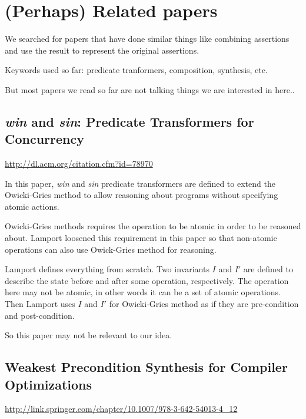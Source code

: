 \documentclass[12pt, fleqn]{article}
\begin{document}

\section{(Perhaps) Related papers}

We searched for papers that have done similar things like combining
assertions and use the result to represent the original assertions.

Keywords used so far: predicate tranformers, composition, synthesis,
etc.

But most papers we read so far are not talking things we are
interested in here..

\subsection{\textsl{win} and \textsl{sin}: Predicate Transformers for Concurrency}

\url{http://dl.acm.org/citation.cfm?id=78970}

\bigskip

In this paper, \textsl{win} and \textsl{sin} predicate transformers
are defined to extend the Owicki-Gries method to allow reasoning about
programs without specifying atomic actions.

Owicki-Gries methods requires the operation to be atomic in order to
be reasoned about. Lamport loosened this requirement in this paper so
that non-atomic operations can also use Owick-Gries method for
reasoning.

Lamport defines everything from scratch. Two invariants $I$ and $I'$
are defined to describe the state before and after some operation,
respectively. The operation here may not be atomic, in other words it
can be a set of atomic operations. Then Lamport uses $I$ and $I'$ for
Owicki-Gries method as if they are pre-condition and post-condition.

So this paper may not be relevant to our idea.


\subsection{Weakest Precondition Synthesis for Compiler Optimizations}

\url{http://link.springer.com/chapter/10.1007/978-3-642-54013-4_12}
\end{document}
